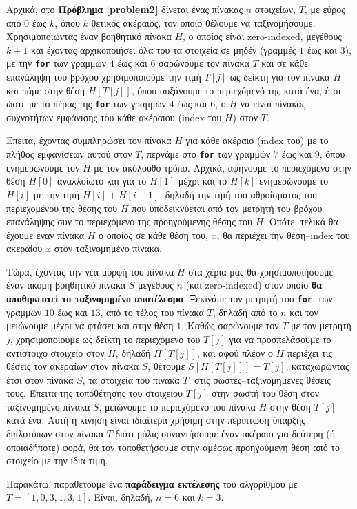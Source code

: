	Αρχικά, στο \textbf{Πρόβλημα \ref{problem2}} δίνεται ένας πίνακας $n$ στοιχείων, $T$, με εύρος από $0$ έως $k$, όπου $k$ θετικός ακέραιος, τον οποίο θέλουμε να ταξινομήσουμε. Χρησιμοποιώντας έναν βοηθητικό πίνακα $H$, ο οποίος είναι zero-indexed, μεγέθους $k+1$ και έχοντας αρχικοποιήσει όλα του τα στοιχεία σε μηδέν (γραμμές $1$ έως και $3$), με την \texttt{\textbf{for}} των γραμμών $4$ έως και $6$ σαρώνουμε τον πίνακα $T$ και σε κάθε επανάληψη του βρόχου χρησιμοποιούμε την τιμή $T[j]$ ως δείκτη για τον πίνακα $H$ και πάμε στην θέση $H[T[j]]$, όπου αυξάνουμε το περιεχόμενό της κατά ένα, έτσι ώστε με το πέρας της \texttt{\textbf{for}} των γραμμών $4$ έως και $6$, ο $H$ να είναι πίνακας συχνοτήτων εμφάνισης του κάθε ακέραιου (index του $H$) στον $T$.\par
	Έπειτα, έχοντας συμπληρώσει τον πίνακα $H$ για κάθε ακέραιο (index του) με το πλήθος εμφανίσεων αυτού στον $T$, περνάμε στο \texttt{\textbf{for}} των γραμμών $7$ έως και $9$, όπου ενημερώνουμε τον $H$ με τον ακόλουθο τρόπο. Αρχικά, αφήνουμε το περιεχόμενο στην θέση $H[0]$ αναλλοίωτο και για το $H[1]$ μέχρι και το $H[k]$ ενημερώνουμε το $H[i]$ με την τιμή $H[i] + H[i-1]$, δηλαδή την τιμή του αθροίσματος του περιεχομένου της θέσης του $H$ που υποδεικνύεται από τον μετρητή του βρόχου επανάληψης συν το περιεχόμενο της προηγούμενης θέσης του $H$. Οπότε, τελικά θα έχουμε έναν πίνακα $H$ ο οποίος σε κάθε θέση του, $x$,  θα περιέχει την θέση--index του ακεραίου $x$ στον ταξινομημένο πίνακα.\par
	Τώρα, έχοντας την νέα μορφή του πίνακα $H$ στα χέρια μας θα χρησιμοποιήσουμε έναν ακόμη βοηθητικό πίνακα $S$ μεγέθους $n$ (και zero-indexed) στον οποίο \textbf{θα αποθηκευτεί το ταξινομημένο αποτέλεσμα}. Ξεκινάμε τον μετρητή του \texttt{\textbf{for}}, των γραμμών $10$ έως και $13$, από το τέλος του πίνακα $Τ$, δηλαδή από το $n$ και τον μειώνουμε μέχρι να φτάσει και στην θέση $1$. Καθώς σαρώνουμε τον $T$ με τον μετρητή $j$, χρησιμοποιούμε ως δείκτη το περιεχόμενο του $T[j]$ για να προσπελάσουμε το αντίστοιχο στοιχείο στον $H$, δηλαδή $H[T[j]]$, και αφού πλέον ο $H$ περιέχει τις θέσεις τον ακεραίων στον πίνακα $S$, θέτουμε $S[H[T[j]]] = T[j]$, καταχωρώντας έτσι στον πίνακα $S$, τα στοιχεία του πίνακα $T$, στις σωστές--ταξινομημένες θέσεις τους. Έπειτα της τοποθέτησης του στοιχείου $T[j]$ στην σωστή του θέση στον ταξινομημένο πίνακα $S$, μειώνουμε το περιεχόμενο του πίνακα $H$ στην θέση $T[j]$ κατά ένα. Αυτή η κίνηση είναι ιδιαίτερα χρήσιμη στην περίπτωση ύπαρξης διπλοτύπων στον πίνακα $T$ διότι μόλις συναντήσουμε έναν ακέραιο για δεύτερη (ή οποιαδήποτε) φορά, θα τον τοποθετήσουμε στην αμέσως προηγούμενη θέση από το στοιχείο με την ίδια τιμή. \par
	Παρακάτω, παραθέτουμε ένα \textbf{παράδειγμα εκτέλεσης} του αλγορίθμου με $T=[1,0,3,1,3,1]$. Είναι, δηλαδή, $n=6$ και $k=3$.


